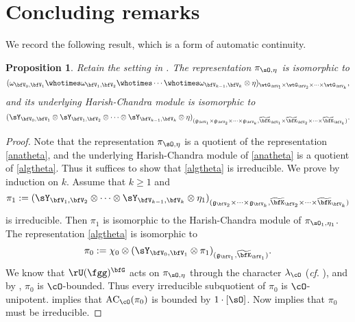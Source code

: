 \documentclass[12pt,a4paper]{amsart}
\newcommand{\AC}{\mathrm{AC}}
\def\AC{\mathrm{AC}}
\newcommand{\g}{\mathfrak g}
\numberwithin{equation}{section}
\newtheorem{prop}[thm]{Proposition}
\theoremstyle{remark}
\def\wtbfK{\widetilde{\bfK}}
\begin{document}
\section{Concluding remarks}
We record the following result, which is a form of automatic continuity.

\begin{prop}Retain the setting in .
  The representation $ \pi_{\sO, \eta}$ is isomorphic to
  \begin{equation}\label{anatheta}
    (\omega_{\bfV_0, \bfV_1}\whotimes \omega_{\bfV_1, \bfV_2} \whotimes \cdots
    \whotimes \omega_{\bfV_{k-1},\bfV_k}\otimes \eta)_{
      \wtG_{\bfV_1}\times \wtG_{\bfV_2}\times \cdots \times  \wtG_{\bfV_k}},
  \end{equation}
  and its underlying Harish-Chandra module is isomorphic to
  \begin{equation}\label{algtheta}
    (\sY_{\bfV_0, \bfV_1} \otimes \sY_{\bfV_1, \bfV_2} \otimes \cdots
    \otimes \sY_{\bfV_{k-1},\bfV_k}\otimes \eta )_{
      (\g_{\bfV_1}\times \g_{\bfV_2}\times \cdots \times \g_{\bfV_k},
      \wtbfK_{\bfV_1}\times  \wtbfK_{\bfV_2}\times \cdots \times \wtbfK_{\bfV_k})}.
  \end{equation}
\end{prop}
\begin{proof}
  Note that the representation $ \pi_{\sO, \eta}$ is a quotient of the
  representation \eqref{anatheta}, and the underlying Harish-Chandra module of
  \eqref{anatheta} is a quotient of \eqref{algtheta}. Thus it suffices to show
  that \eqref{algtheta} is irreducible.  We prove by induction on $k$. Assume that $k\geq 1$ and
  \[
    \pi_1:= (\sY_{\bfV_1, \bfV_2} \otimes \cdots \otimes
    \sY_{\bfV_{k-1},\bfV_k}\otimes \eta_1)_{(\g_{\bfV_2}\times
      \cdots \times \g_{\bfV_k}, \widetilde{\bfK}_{\bfV_2}\times \cdots \times \widetilde{\bfK}_{\bfV_k})}
  \]
  is irreducible. Then $\pi_1$ is isomorphic to the Harish-Chandra module of
  $ \pi_{\sO_1, \eta_1}$.  The representation \eqref{algtheta} is isomorphic to
  \[
    \pi_0:= \chi_0 \otimes (\sY_{\bfV_0, \bfV_1} \otimes \pi_1)_{(\g_{\bfV_1},
      \widetilde{\bfK}_{\bfV_1})}.
  \]
  We know that  $\rU(\fgg)^{\bfG} $ acts on $\pi_{\sO, \eta}$ through the character $\lambda_{\cO}$ (\emph{cf}. \cite{PrzInf}), and by
  , $\pi_0$ is $\cO$-bounded.  Thus every irreducible
  subquotient of $\pi_0$ is $\cO$-unipotent.  
  implies that $\AC_{\cO}(\pi_0)$ is bounded by $1\cdot [\sO]$. Now
   implies that $\pi_0$ must be irreducible.
\end{proof}
\end{document}
